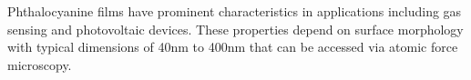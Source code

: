 Phthalocyanine films have prominent characteristics in applications including gas
sensing and photovoltaic devices. These properties depend on surface morphology with
typical dimensions of 40nm to 400nm that can be accessed via atomic force microscopy.